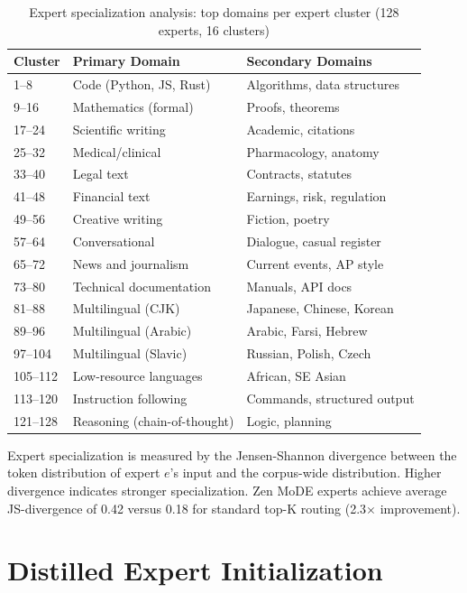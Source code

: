\documentclass[11pt,a4paper]{article}
\begin{document}
\begin{table}[H]
\centering
\caption{Expert specialization analysis: top domains per expert cluster (128 experts, 16 clusters)}
\label{tab:specialization}
\begin{tabular}{lll}
\toprule
Cluster & Primary Domain & Secondary Domains \\
\midrule
1--8 & Code (Python, JS, Rust) & Algorithms, data structures \\
9--16 & Mathematics (formal) & Proofs, theorems \\
17--24 & Scientific writing & Academic, citations \\
25--32 & Medical/clinical & Pharmacology, anatomy \\
33--40 & Legal text & Contracts, statutes \\
41--48 & Financial text & Earnings, risk, regulation \\
49--56 & Creative writing & Fiction, poetry \\
57--64 & Conversational & Dialogue, casual register \\
65--72 & News and journalism & Current events, AP style \\
73--80 & Technical documentation & Manuals, API docs \\
81--88 & Multilingual (CJK) & Japanese, Chinese, Korean \\
89--96 & Multilingual (Arabic) & Arabic, Farsi, Hebrew \\
97--104 & Multilingual (Slavic) & Russian, Polish, Czech \\
105--112 & Low-resource languages & African, SE Asian \\
113--120 & Instruction following & Commands, structured output \\
121--128 & Reasoning (chain-of-thought) & Logic, planning \\
\bottomrule
\end{tabular}
\end{table}

Expert specialization is measured by the Jensen-Shannon divergence between the token distribution of expert $e$'s input and the corpus-wide distribution. Higher divergence indicates stronger specialization. Zen MoDE experts achieve average JS-divergence of 0.42 versus 0.18 for standard top-K routing (2.3$\times$ improvement).

\section{Distilled Expert Initialization}
\end{document}

